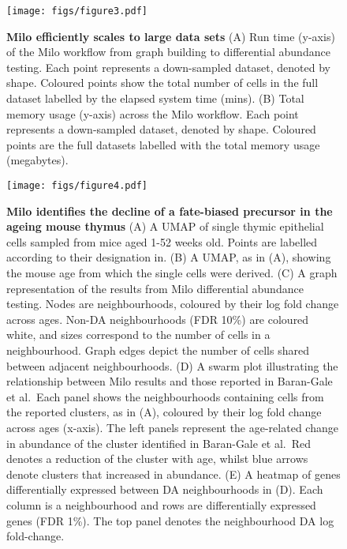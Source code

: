 \documentclass[
]{article}
\begin{document}
\begin{figure}
\centering
\texttt{[image: figs/figure3.pdf]}
\caption{\label{fig:fig-3}\textbf{Milo efficiently scales to large data sets}
(A) Run time (y-axis) of the Milo workflow from graph building to differential abundance testing. Each point represents a down-sampled dataset, denoted by shape. Coloured points show the total number of cells in the full dataset labelled by the elapsed system time (mins).
(B) Total memory usage (y-axis) across the Milo workflow. Each point represents a down-sampled dataset, denoted by shape. Coloured points are the full datasets labelled with the total memory usage (megabytes).}
\end{figure}





\begin{figure}
\centering
\texttt{[image: figs/figure4.pdf]}
\caption{\label{fig:fig-4}\textbf{Milo identifies the decline of a fate-biased precursor in the ageing mouse thymus}
(A) A UMAP of single thymic epithelial cells sampled from mice aged 1-52 weeks old. Points are labelled according to their designation in.
(B) A UMAP, as in (A), showing the mouse age from which the single cells were derived.
(C) A graph representation of the results from Milo differential abundance testing. Nodes are neighbourhoods, coloured by their log fold change across ages. Non-DA neighbourhoods (FDR 10\%) are coloured white, and sizes correspond to the number of cells in a neighbourhood. Graph edges depict the number of cells shared between adjacent neighbourhoods.
(D) A swarm plot illustrating the relationship between Milo results and those reported in Baran-Gale et al.~Each panel shows the neighbourhoods containing cells from the reported clusters, as in (A), coloured by their log fold change across ages (x-axis). The left panels represent the age-related change in abundance of the cluster identified in Baran-Gale et al.~Red denotes a reduction of the cluster with age, whilst blue arrows denote clusters that increased in abundance.
(E) A heatmap of genes differentially expressed between DA neighbourhoods in (D). Each column is a neighbourhood and rows are differentially expressed genes (FDR 1\%). The top panel denotes the neighbourhood DA log fold-change.}
\end{figure}
\end{document}
